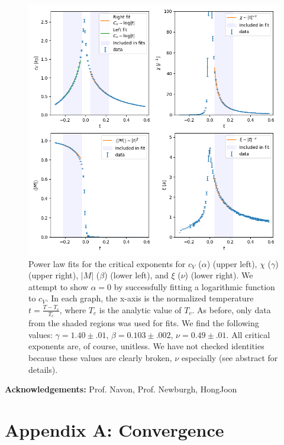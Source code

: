 \documentclass[letter,scriptaddress,twocolumn, prl,nofootinbib]{revtex4}
\begin{document}
\begin{figure}[h]
	\begin{center}
		\includegraphics[width=1\textwidth]{figs/fig5_crit_exponents.png}
		\caption{Power law fits for the critical exponents for $c_V$ ($\alpha$) (upper left), $\chi$ ($\gamma$) (upper right), $|M|$ ($\beta$) (lower left), and $\xi$ ($\nu$) (lower right). We attempt to show $\alpha = 0$ by successfully fitting a logarithmic function to $c_V$. In each graph, the x-axis is the normalized temperature $t = \frac{T - T_c}{T_c}$, where $T_c$ is the analytic value of $T_c$. As before, only data from the shaded regions was used for fits. We find the following values: $\gamma = 1.40 \pm .01$, $\beta = 0.103 \pm .002$, $\nu = 0.49 \pm .01$. All critical exponents are, of course, unitless. We have not checked identities because these values are clearly broken, $\nu$ especially (see abstract for details).}
		\label{fig:fig5}
	\end{center}
\end{figure}

\textbf{Acknowledgements:}
	Prof. Navon, Prof. Newburgh, HongJoon
	
 


\appendix
\section{Appendix A: Convergence}
\end{document}
